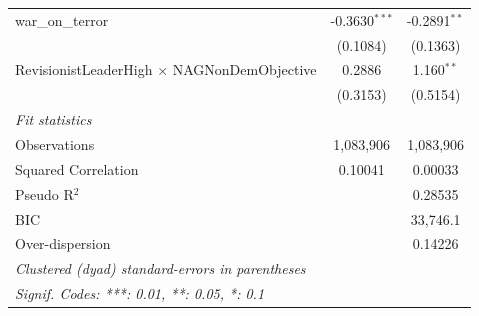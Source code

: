 \begin{tabular}{lcc}
   war\_on\_terror                                    & -0.3630$^{***}$      & -0.2891$^{**}$\\   
                                                      & (0.1084)             & (0.1363)\\   
   RevisionistLeaderHigh $\times$ NAGNonDemObjective  & 0.2886               & 1.160$^{**}$\\   
                                                      & (0.3153)             & (0.5154)\\   
   \midrule
   \emph{Fit statistics}\\
   Observations                                       & 1,083,906            & 1,083,906\\  
   Squared Correlation                                & 0.10041              & 0.00033\\  
   Pseudo R$^2$                                       &                      & 0.28535\\  
   BIC                                                &                      & 33,746.1\\  
   Over-dispersion                                    &                      & 0.14226\\  
   \midrule \midrule
   \multicolumn{3}{l}{\emph{Clustered (dyad) standard-errors in parentheses}}\\
   \multicolumn{3}{l}{\emph{Signif. Codes: ***: 0.01, **: 0.05, *: 0.1}}\\
\end{tabular}
\par\endgroup


